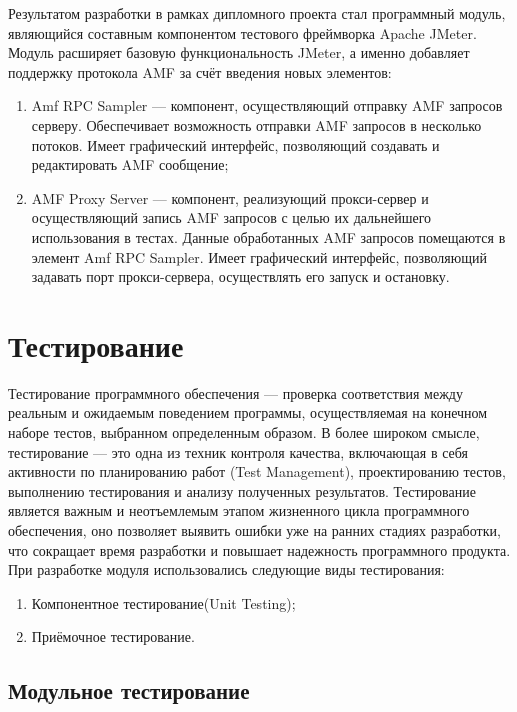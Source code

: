 Результатом разработки в рамках дипломного проекта стал программный модуль, являющийся составным компонентом тестового
фреймворка Apache JMeter. Модуль расширяет базовую функциональность JMeter, а именно добавляет поддержку протокола AMF
за счёт введения новых элементов:

\begin{enumerate}
\item Amf RPC Sampler --- компонент, осуществляющий отправку AMF запросов серверу. Обеспечивает возможность отправки
 AMF запросов в несколько потоков. Имеет графический интерфейс,
позволяющий создавать и редактировать AMF сообщение;
\item AMF Proxy Server --- компонент, реализующий прокси-сервер и осуществляющий запись AMF запросов с целью их дальнейшего использования в тестах.
Данные обработанных AMF запросов помещаются в элемент Amf RPC Sampler. Имеет графический интерфейс, позволяющий задавать
порт прокси-сервера, осуществлять его запуск и остановку.
\end{enumerate}

\section{Тестирование}

Тестирование программного обеспечения --- проверка соответствия между реальным и ожидаемым поведением программы,
осуществляемая на конечном наборе тестов, выбранном определенным образом\cite{swebok}.
В более широком смысле, тестирование --- это одна из техник контроля качества, включающая в себя активности по
планированию работ (Test Management), проектированию тестов, выполнению тестирования и анализу полученных результатов.
Тестирование является важным и неотъемлемым этапом жизненного цикла программного обеспечения, оно позволяет выявить
ошибки уже на ранних стадиях разработки, что сокращает время разработки и повышает надежность программного продукта.
При разработке модуля использовались следующие виды тестирования:

\begin{enumerate}
\item Компонентное тестирование(Unit Testing);
\item Приёмочное тестирование.
\end{enumerate}

\subsection{Модульное тестирование}

